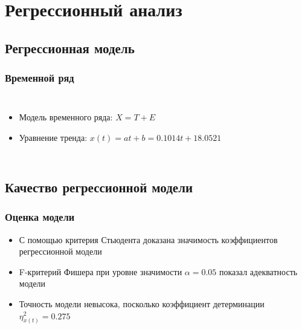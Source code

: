 \documentclass[10pt,pdf,aspectratio=169]{beamer}
\begin{document}
\section{Регрессионный анализ}

\subsection{Регрессионная модель}
\begin{frame}
  \frametitle{Временной ряд}   %
  \begin{columns}[c]
  \column{2in}  %
  \begin{itemize}
  \item<1-> Модель временного ряда: $ X = T + E $
  \item<2-> Уравнение тренда: $ x(t) = at + b = 0.1014t + 18.0521 $
  \end{itemize}
  \column{3in}
  \end{columns}
\end{frame}

\subsection{Качество регрессионной модели}
\begin{frame}
  \frametitle{Оценка модели}   %
  \begin{itemize}
    \item<1-> С помощью критерия Стьюдента доказана значимость коэффициентов регрессионной модели
    \item<2-> F-критерий Фишера при уровне значимости $ \alpha = 0.05 $ показал адекватность модели
    \item<3-> Точность модели невысока, посколько коэффициент детерминации $ \eta^2_{x(t)} = 0.275 $
  \end{itemize}
\end{frame}
\end{document}
